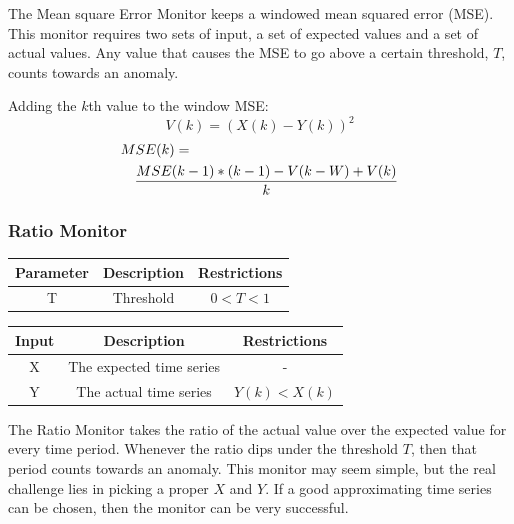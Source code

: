 \documentclass[12pt]{ucthesis}
\begin{document}
The Mean square Error Monitor keeps a windowed mean squared error (MSE). This monitor requires two sets of input, a set
of expected values and a set of actual values. Any value that causes the MSE to go above a certain threshold, $T$,
counts towards an anomaly.

Adding the $k$th value to the window MSE:
$$
   V(k) = (X(k) - Y(k))^{2}
$$
\begin{eqnarray*}
   \lefteqn{MSE(k) = }\\
   && \frac{MSE(k - 1) * (k - 1) - V(k - W) + V(k)}{k}
\end{eqnarray*}

\subsubsection{Ratio Monitor}
\label{outage-detection-monitors-Ratio}
\begin{table}[H]
   \begin{center}
      \begin{tabular}{|c|c|c|}
         \hline
            Parameter & Description & Restrictions \\
         \hline
            T & Threshold & $ 0 < T < 1 $\\
         \hline
      \end{tabular}
   \end{center}
\end{table}

\begin{table}[H]
   \begin{center}
      \begin{tabular}{|c|c|c|}
         \hline
            Input & Description & Restrictions \\
         \hline
            X & The expected time series & - \\
         \hline
            Y & The actual time series & $ Y(k) < X(k) $\\
         \hline
      \end{tabular}
   \end{center}
\end{table}

The Ratio Monitor takes the ratio of the actual value over the expected value for every time period.
Whenever the ratio dips under the threshold $T$, then that period counts towards an anomaly.
This monitor may seem simple, but the real challenge lies in picking a proper $X$ and $Y$.
If a good approximating time series can be chosen, then the monitor can be very successful.
\end{document}
